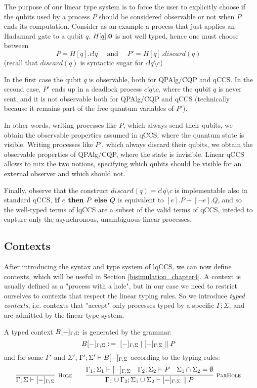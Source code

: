 The purpose of our linear type system is to force the user to explicitly choose if the qubits used by a process $P$ should be considered  observable or not when $P$ ends its computation. Consider as an example a process that just applies an Hadamard gate  to a qubit $q$. $H[q].\mathbf{0}$ is not well typed, hence one must choose
between 
\[ P = H[q].c!q \quad\text{ and }\quad P' = H[q].discard(q)
\]
(recall that $discard(q)$ is syntactic sugar for $c!q\setminus c$)

In the first case the qubit $q$ is observable, both for QPAlg/CQP and qCCS. In the second case, $P'$ ends up in a deadlock process $c!q \setminus c$, where the qubit $q$ is never sent, and it is not observable both for QPAlg/CQP and qCCS (technically because it remains part of the free quantum variables of $P'$). 

In other words, writing processes like $P$, which always send their qubits, we obtain the observable properties assumed in qCCS, where the quantum state is visible. Writing processes like $P'$, which always discard their qubits, we obtain the observable properties of QPAlg/CQP, where the state is invisible. Linear qCCS allows to mix the two notions, specifying which qubits should be visible for an external observer and which should not.

Finally, observe that the construct $discard(q) = c!q \setminus c$ is implementable also in standard qCCS, $\textbf{if } e \textbf{ then } P \textbf{ else } Q$ is equivalent to $[e].P + [\neg e].Q$, and so the well-typed terms of lqCCS are a subset of the valid terms of qCCS, inteded to capture only the asynchronous, unambiguous linear processes.

\subsection{Contexts}
After introducing the syntax and type system of lqCCS, we can now define contexts, which will be useful in Section \ref{bisimulation_chapter4}. A context is usually defined as a "process with a hole", but in our case we need to restrict ourselves to contexts that respect the linear typing rules. So we introduce \textit{typed contexts}, i.e. contexts that "accept" only processes typed by a specific $\Gamma;\Sigma$, and are admitted by the linear type system.

\begin{definition}
A typed context $B[{-}]_{\Gamma; \Sigma}$ is generated by the grammar:
\[
B[\blank]_{\Gamma; \Sigma} \Coloneqq \ [\blank]_{\Gamma; \Sigma} \mid [\blank]_{\Gamma; \Sigma} \parallel P
\]
and for some $\Gamma'$ and $\Sigma'$, $\Gamma';\Sigma' \vdash B[{-}]_{\Gamma; \Sigma}$ according to the typing rules:
\[
  \infer[\mbox{\footnotesize\scshape Hole}]{\Gamma; \Sigma \vdash [\blank]_{\Gamma; \Sigma}}{}
\qquad
\infer[\mbox{\footnotesize\scshape ParHole}]{\Gamma_1 \cup \Gamma_2; \Sigma_1 \cup \Sigma_2 \vdash [\blank]_{\Gamma; \Sigma} \parallel P}
{\Gamma_1; \Sigma_1 \vdash [\blank]_{\Gamma; \Sigma} & \Gamma_2; \Sigma_2 \vdash P & \Sigma_1 \cap \Sigma_2 = \emptyset}
\]
\end{definition}


